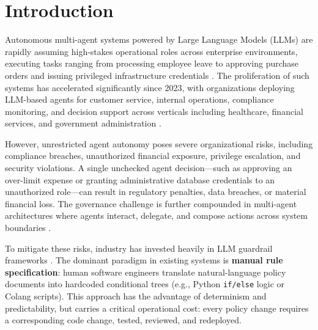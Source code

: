 \documentclass[sigconf,screen]{acmart}
\begin{document}

\maketitle

\section{Introduction}
Autonomous multi-agent systems powered by Large Language Models (LLMs) are rapidly assuming high-stakes operational roles across enterprise environments, executing tasks ranging from processing employee leave to approving purchase orders and issuing privileged infrastructure credentials \cite{xi2023rise}. The proliferation of such systems has accelerated significantly since 2023, with organizations deploying LLM-based agents for customer service, internal operations, compliance monitoring, and decision support across verticals including healthcare, financial services, and government administration \cite{wang2024survey}.

However, unrestricted agent autonomy poses severe organizational risks, including compliance breaches, unauthorized financial exposure, privilege escalation, and security violations. A single unchecked agent decision---such as approving an over-limit expense or granting administrative database credentials to an unauthorized role---can result in regulatory penalties, data breaches, or material financial loss. The governance challenge is further compounded in multi-agent architectures where agents interact, delegate, and compose actions across system boundaries \cite{talebirad2023multi}.

To mitigate these risks, industry has invested heavily in LLM guardrail frameworks \cite{rebedea2023nemo, chen2024guardagent, dong2024safeguarding}. The dominant paradigm in existing systems is \textbf{manual rule specification}: human software engineers translate natural-language policy documents into hardcoded conditional trees (e.g., Python \texttt{if/else} logic or Colang scripts). This approach has the advantage of determinism and predictability, but carries a critical operational cost: every policy change requires a corresponding code change, tested, reviewed, and redeployed.
\end{document}
